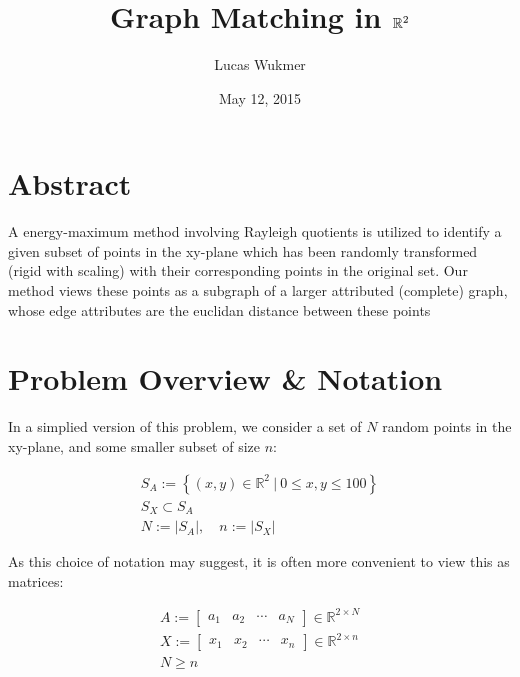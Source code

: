 \documentclass[10pt,twocolumn]{article}
\title{Graph Matching in $\R^2$}
\author{Lucas Wukmer}
\date{May 12, 2015}
\providecommand{\R}{\mathbb{R}}%
\begin{document}
\maketitle
\tableofcontents

\section{Abstract}
A energy-maximum method involving Rayleigh quotients is utilized to identify a
given subset of points in the xy-plane which has been randomly transformed
(rigid with scaling) with their corresponding points in the original set. Our
method views these points as a subgraph of a larger attributed (complete)
graph, whose edge attributes are the euclidan distance between these points

\section{Problem Overview \& Notation}
In a simplied version of this problem, we consider a set of $N$ random points
in the xy-plane, and some smaller subset of size $n$:

\begin{subequations}
  \begin{align}
    S_A := \left\{ (x,y) \in \R^2 \ | \  0 \leq x,y \leq 100 \right\} \\
    S_X \subset S_A \\
  N := |S_A|, \quad n := |S_X|
  \end{align}
\end{subequations}

As this choice of notation may suggest, it is often more convenient to view
this as matrices:

\begin{subequations}
  \begin{align}
    A := \begin{bmatrix}
      a_1     & a_2    & \cdots   & a_N
    \end{bmatrix} \in \R^{2\times N}\\
    X := \begin{bmatrix}
      x_1     & x_2    & \cdots   & x_n
    \end{bmatrix} \in \R^{2\times n}\\
    N \geq n
  \end{align}
\end{subequations}
\end{document}
